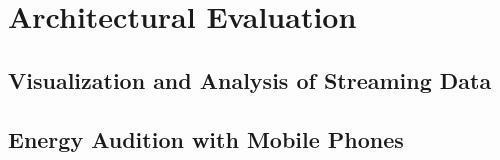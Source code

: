 
\chapter{Architectural Evaluation}


\section{Visualization and Analysis of Streaming Data}

\section{Energy Audition with Mobile Phones}










